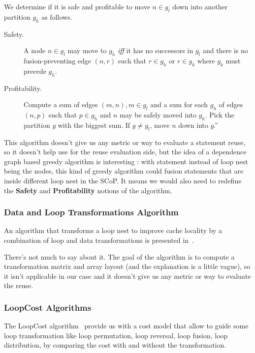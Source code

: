 \documentclass[paper=a4, fontsize=11.5pt]{scrartcl}
\numberwithin{equation}{section}        %
\numberwithin{figure}{section}          %
\numberwithin{table}{section}               %
\begin{document}
                We determine if it is safe and profitable to move $n \in g_l$ down
                into another partition $g_h$ as follows.
                \begin{description}
                    \item [Safety.] A node $n \in g_l$ may move to $g_h$ \textit{iff} it
                        has no successors in $g_l$ and there is no fusion-preventing
                        edge $(n,r)$ such that $r \in g_h$ or $r \in g_k$ where
                        $g_k$ must precede $g_h$.
                    \item [Profitability.] Compute a sum of edges $(m,n), m \in g_l$
                        and a sum for each $g_h$ of edges $(n,p)$ such that $p \in g_h$
                        and $n$ may be safely moved into $g_h$. Pick the partition
                        $g$ with the biggest sum. If $g \neq g_l$, move $n$ down into $g$.''
                \end{description}
            \bigskip
            
            This algorithm doesn't give us any metric or way to evaluate a statement
            reuse, so it doesn't help use for the reuse evaluation side, but the idea
            of a dependence graph based greedy algorithm is interesting : with statement
            instead of loop nest being the nodes, this kind of greedy algorithm 
            could fusion statements that are inside different loop nest in the SCoP.
            It means we would also need to redefine the \textbf{Safety} and \textbf{Profitability}
            notions of the algorithm.

        \subsubsection{Data and Loop Transformations Algorithm}
            An algorithm that transforms a loop nest to improve cache locality
            by a combination of loop and data transformations is presented in~\cite{Kandemir99improvingcache}.

            There's not much to say about it. The goal of the algorithm is to
            compute a transformation matrix and array layout (and the explanation is a little
            vague), so it isn't applicable in our case and it doesn't give us any metric or way to evaluate the reuse.
        
        \subsubsection{LoopCost Algorithms}
            The LoopCost algorithm~\cite{McKinley:1996:IDL:233561.233564} provide
            us with a cost model that allow to guide some loop transformation like
            loop permutation, loop reversal, loop fusion, loop distribution,
            by comparing the cost with and without the transformation.
            
\end{document}

